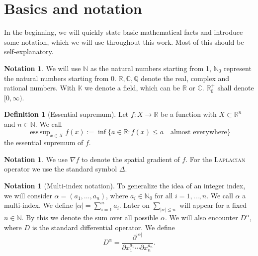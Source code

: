 \documentclass[12pt,a4paper,twoside, open=right]{scrreprt}
\theoremstyle{definition}
\newtheorem{defn}[auf]{Definition}
\newtheorem{notation}[auf]{Notation}
\theoremstyle{plain}
\DeclareMathOperator*{\esssup}{ess\,sup} %
\newcommand{\abs}[1]{\left\vert #1\right\vert}
\newcommand{\rr}{\mathbb{R}}
\newcommand{\cc}{\mathbb{C}}
\newcommand{\kk}{\mathbb{K}}
\newcommand{\nn}{\mathbb{N}}
\newcommand{\qq}{\mathbb{Q}}
\begin{document}
\section{Basics and notation}
In the beginning, we will quickly state basic mathematical facts and introduce some notation, which we will use throughout this work. Most of this should be self-explanatory.
\begin{notation}
    We will use $\nn$ as the natural numbers starting from 1, $\nn_0$ represent the natural numbers starting from 0. $\rr,\cc,\qq$ denote the real, complex and rational numbers. With $\kk$ we denote a field, which can be $\rr$ or $\cc$. $\rr^+_0$ shall denote $[0,\infty)$.
\end{notation} 
\begin{defn}[Essential supremum]
    Let $f\colon X\to \rr$ be a function with $X\subset\rr^n$ and $n\in\nn$. We call 
    \begin{equation}
        \esssup_{x\in X}f(x):=\inf\{a\in\rr\colon f(x)\le a\quad\text{almost everywhere}\}
    \end{equation}
    the essential supremum of $f$. 
\end{defn}
\begin{notation}
    We use $\nabla f$ to denote the spatial gradient of $f$. For the \textsc{Laplacian} operator we use the standard symbol $\Delta$. 
\end{notation}
\begin{notation}[Multi-index notation]
    To generalize the idea of an integer index, we will consider $\alpha=(a_1,\dotsc,a_n)$, where $a_i\in\nn_0$ for all $i=1,\dotsc,n$. We call $\alpha$ a multi-index. We define $\abs{\alpha}=\sum_{i=1}^na_i$. Later on $\sum_{\abs{\alpha}\le n}$ will appear for a fixed $n\in\nn$. By this we denote the sum over all possible $\alpha$. We will also encounter $D^\alpha$, where $D$ is the standard differential operator. We define \begin{equation}
        D^\alpha=\frac{\partial^{\abs{\alpha}}}{\partial x_1^{a_1}\dotsb\partial x_n^{a_n}}.
    \end{equation}
\end{notation}
\end{document}
